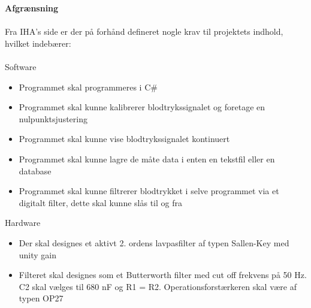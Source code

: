 \textbf{Afgrænsning}\\ \\
Fra IHA’s side er der på forhånd defineret nogle krav til projektets indhold, hvilket indebærer:\\ \\
Software 
\begin{itemize}
	\item Programmet skal programmeres i C\#
	\item Programmet skal kunne kalibrerer blodtrykssignalet og foretage en nulpunktsjustering
	\item Programmet skal kunne vise blodtrykssignalet kontinuert
	\item Programmet skal kunne lagre de måte data i enten en tekstfil eller en database
	\item Programmet skal kunne filtrerer blodtrykket i selve programmet via et digitalt filter, dette skal kunne slås til og fra
\end{itemize}

Hardware
\begin{itemize}
	\item Der skal designes et aktivt 2. ordens lavpasfilter af typen Sallen-Key med unity gain
	\item Filteret skal designes som et Butterworth filter med cut off frekvens på 50 Hz. C2 skal vælges til 680 nF og R1 = R2. Operationsforstærkeren skal være af typen OP27
\end{itemize}
